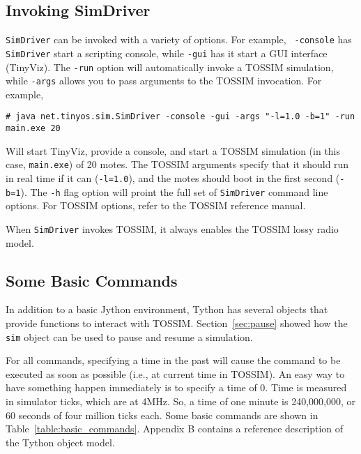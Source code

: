 \documentclass[10pt]{article}
\newcommand{\name}{{Tython}\xspace}
\newcommand{\driver}{{\tt SimDriver}\xspace}
\begin{document}
\subsection{Invoking SimDriver}

\driver can be invoked with a variety of options. For example, {\tt
  -console} has \driver start a scripting console, while {\tt -gui}
has it start a GUI interface (TinyViz). The {\tt -run} option will
automatically invoke a TOSSIM simulation, while {\tt -args} allows you
to pass arguments to the TOSSIM invocation. For example,

\begin{verbatim}
# java net.tinyos.sim.SimDriver -console -gui -args "-l=1.0 -b=1" -run main.exe 20
\end{verbatim}

Will start TinyViz, provide a console, and start a TOSSIM simulation
(in this case, {\tt main.exe}) of 20 motes. The TOSSIM arguments
specify that it should run in real time if it can ({\tt -l=1.0}), and
the motes should boot in the first second ({\tt -b=1}). The {\tt -h}
flag option will proint the full set of \driver command line options.
For TOSSIM options, refer to the TOSSIM reference manual.

When \driver invokes TOSSIM, it always enables the TOSSIM lossy radio
model.

\subsection{Some Basic Commands}
\label{sec:commands}

In addition to a basic Jython environment, \name has several objects
that provide functions to interact with
TOSSIM. Section~\ref{sec:pause} showed how the {\tt sim} object can be
used to pause and resume a simulation. 

For all commands, specifying a time in the past will cause the command
to be executed as soon as possible (i.e., at current time in TOSSIM).
An easy way to have something happen immediately is to specify a time
of 0. Time is measured in simulator ticks, which are at 4MHz. So, a
time of one minute is 240,000,000, or 60 seconds of four million ticks
each. Some basic commands are shown in
Table~\ref{table:basic_commands}. Appendix B contains a reference
description of the \name object model.
\end{document}
